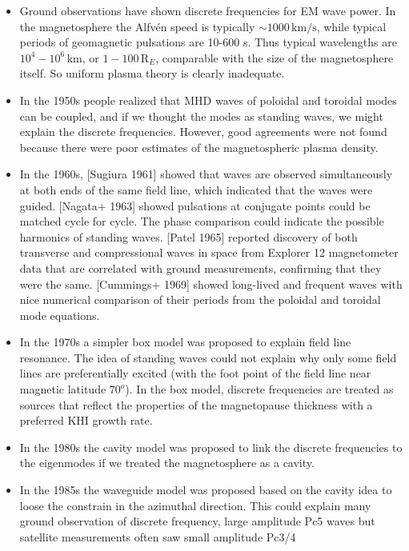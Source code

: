 \documentclass[
  notoc %
]{tufte-book}
\providecommand{\tightlist}{%
  \setlength{\itemsep}{0pt}\setlength{\parskip}{0pt}
}
\begin{document}
\begin{itemize}
\tightlist
\item
  Ground observations have shown discrete frequencies for EM wave power.
  In the magnetosphere the Alfvén speed is typically
  \(\sim 1000\,\text{km/s}\), while typical periods of geomagnetic
  pulsations are 10-600 s. Thus typical wavelengths are
  \(10^4-10^6\,\text{km}\), or \(1-100\,\text{R}_E\), comparable with
  the size of the magnetosphere itself. So uniform plasma theory is
  clearly inadequate.
\item
  In the 1950s people realized that MHD waves of poloidal and toroidal
  modes can be coupled, and if we thought the modes as standing waves,
  we might explain the discrete frequencies. However, good agreements
  were not found because there were poor estimates of the magnetospheric
  plasma density.
\item
  In the 1960s, {[}Sugiura 1961{]} showed that waves are observed
  simultaneously at both ends of the same field line, which indicated
  that the waves were guided. {[}Nagata+ 1963{]} showed pulsations at
  conjugate points could be matched cycle for cycle. The phase
  comparison could indicate the possible harmonics of standing waves.
  {[}Patel 1965{]} reported discovery of both transverse and
  compressional waves in space from Explorer 12 magnetometer data that
  are correlated with ground measurements, confirming that they were the
  same. {[}Cummings+ 1969{]} showed long-lived and frequent waves with
  nice numerical comparison of their periods from the poloidal and
  toroidal mode equations.
\item
  In the 1970s a simpler box model was proposed to explain field line
  resonance. The idea of standing waves could not explain why only some
  field lines are preferentially excited (with the foot point of the
  field line near magnetic latitude \(70^o\)). In the box model,
  discrete frequencies are treated as sources that reflect the
  properties of the magnetopause thickness with a preferred KHI growth
  rate.
\item
  In the 1980s the cavity model was proposed to link the discrete
  frequencies to the eigenmodes if we treated the magnetosphere as a
  cavity.
\item
  In the 1985s the waveguide model was proposed based on the cavity idea
  to loose the constrain in the azimuthal direction. This could explain
  many ground observation of discrete frequency, large amplitude Pc5
  waves but satellite measurements often saw small amplitude Pc3/4

\end{itemize}
\end{document}
